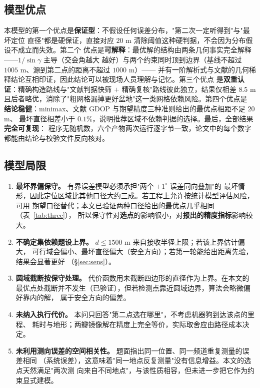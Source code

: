 \subsection{模型优点}

本模型的第一个优点是\textbf{保证型}：不假设任何误差分布，"第二次一定听得到"与"最坏定位
直径"都是硬保证，直接对应 $20$ m 清除阈值这种硬判据，不会因为分布假设不成立而失效。第二个
优点是\textbf{可解释}：最优解的结构由两条几何事实完全解释——$1/\sin\gamma$ 主导（交会角越大
越好）与两个约束同时顶到边界（基线不超过 $1005$ m、源到第二点的距离不超过 $1000$ m）——
并有一阶解析式与文献的几何稀释结论互相印证，因此结论可以被现场人员理解与记忆。第三个优点
是\textbf{双重认证}：精确构造路线与"文献判据快筛 $+$ 精确复核"路线彼此独立，结果仅相差
$8.5$ m 且后者略优，消除了"粗网格漏掉更好盆地"这一类网格依赖风险。第四个优点是
\textbf{结论稳健}：minimax、文献 GDOP 与期望精度三种准则给出的最优点相距不足 $20$ m、
最坏直径相差小于 $0.1\%$，说明推荐区域不依赖判据的选择。最后，全部结果\textbf{完全可复现}：
程序无随机数，六个产物两次运行逐字节一致，论文中的每个数字都能由结论与校验文件反向核对。

\subsection{模型局限}

\begin{enumerate}
  \item \textbf{最坏界偏保守。} 有界误差模型必须承担"两个 $\pm1^\circ$ 误差同向叠加"的
        最坏情形，因此定位区域比其他口径大约三成。若工程上允许按统计模型评估风险，可用
        期望口径替代；本文已验证两种口径给出的最优点几乎相同（表~\ref{tab:three}），
        所以保守性对\textbf{选点}的影响很小，对\textbf{报出的精度指标}影响较大。
  \item \textbf{不确定集依赖题设上界。} $d\le1500$ m 来自接收半径上限；若该上界估计偏大，
        可行域会偏小、最坏直径偏大（安全方向）；若第一轮能给出距离先验，结果会显著更好
        （§\ref{sec:sens}）。
  \item \textbf{圆域截断按保守处理。} 代价函数用未截断四边形的直径作为上界。在本文的
        最优点处截断并不发生（已验证），但若检测点靠近圆域边界，算法会略微偏好靠内的解，
        属于安全方向的偏差。
  \item \textbf{未纳入执行代价。} 本问只回答"第二点选在哪里"，不考虑机器狗到达该点的里程、
        耗时与地形；两瓣镜像解在精度上完全等价，实际取舍应由路径成本决定。
  \item \textbf{未利用测向误差的空间相关性。} 题面指出同一位置、同一频道重复测量的误差相同
        （系统误差），这意味着"同一地点反复测量"没有信息增益。本文的选点天然满足"两次测
        向来自不同地点"，与该性质相容，但未进一步把它作为约束显式建模。
\end{enumerate}

